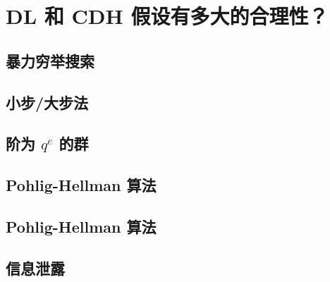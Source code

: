 \section{DL 和 CDH 假设有多大的合理性？}\label{sec:17-2}

\subsection{暴力穷举搜索}\label{subsec:17-2-1}

\subsection{小步/大步法}\label{subsec:17-2-2}

\subsection{阶为 $q^e$ 的群}\label{subsec:17-2-3}

\subsection{Pohlig-Hellman 算法}\label{subsec:17-2-4}

\subsection{Pohlig-Hellman 算法}\label{subsec:17-2-5}

\subsection{信息泄露}\label{subsec:17-2-6}